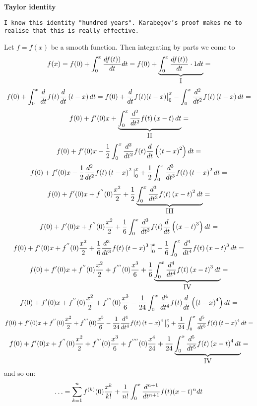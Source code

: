 \medskip

\centerline {\bf Taylor identity}

{\tt I know this identity "hundred  years". 
Karabegov's proof makes me to realise that
this is really effective.}

\medskip

   Let $f=f(x)$ be a smooth function. Then
          integrating by parts we come to
                $$
f(x)=
f(0)+\int_0^x {d f(t))\over dt}dt=
f(0)+\underbrace{\int_0^x {d f(t))\over dt}\cdot 1 dt}
        _{\hbox{I}}=
         $$
          $$
f(0)+\int_0^x {d\over dt} f(t){d\over dt}\left(t-x\right)dt=
f(0)+{d\over dt} f(t)(t-x)\big\vert^x_0-
   \int_0^x {d^2\over dt^2} f(t)\left(t-x\right)dt=
            $$
           $$
f(0)+f'(0)x+
   \underbrace
            {
 \int_0^x {d^2\over dt^2} f(t)\left(x-t\right)dt
           }_{\hbox{II}}=
            $$
            $$
f(0)+f'(0)x-    {1\over2}\int_0^x {d^2\over dt^2} f(t)
    {d\over dt}\left(\left(t-x\right)^2\right)dt
           =
           $$
        $$
f(0)+f'(0)x
-   {1\over 2} {d^2\over dt^2} f(t)
    \left(t-x\right)^2\big\vert^x_0
   +
   {1\over 2}\int_0^x {d^3\over dt^3} f(t)
    \left(t-x\right)^2 dt=
          $$
            $$
f(0)+f'(0)x
+f^{''}(0) {x^2\over 2}  
   +
             {1\over 2}
      \underbrace
         {
\int_0^x {d^3\over dt^3} f(t)
    \left(x-t\right)^2 dt
        }_{\hbox{III}}=
          $$
          $$
f(0)+f'(0)x
+f^{''}(0){x^2\over 2}
+    {1\over 6 }\int_0^x {d^3\over dt^3} f(t)
    {d\over dt}\left(\left(x-t\right)^3\right)dt
           =
          $$
            $$
f(0)+f'(0)x
+f^{''}(0){x^2\over 2}
+   {1\over 6} {d^3\over dt^3} f(t)
    \left(t-x\right)^3\big\vert^x_0
   -
   {1\over 6}\int_0^x {d^4\over dt^4} f(t)
    \left(x-t\right)^3 dt=
          $$
            $$
f(0)+f'(0)x
+f^{''}(0) {x^2\over 2}  
+f^{'''}(0) {x^3\over 6}  
   +
             {1\over 6}
      \underbrace
         {
\int_0^x {d^4\over dt^4} f(t)
    \left(x-t\right)^3 dt
        }_{\hbox{IV}}=
          $$
           $$
f(0)+f'(0)x
+f^{''}(0){x^2\over 2}
+f^{'''}(0){x^3\over 6}
-    {1\over 24 }\int_0^x {d^4\over dt^4} f(t)
    {d\over dt}\left(\left(t-x\right)^4\right)dt
           =
          $$
            $$
f(0)+f'(0)x
+f^{''}(0){x^2\over 2}
+f^{'''}(0){x^3\over 6}
-   {1\over 24} {d^4\over dt^4} f(t)
    \left(t-x\right)^4\big\vert^x_0
   +
   {1\over 24}\int_0^x {d^5\over dt^5} f(t)
    \left(t-x\right)^4 dt=
          $$
            $$
f(0)+f'(0)x
+f^{''}(0) {x^2\over 2}  
+f^{'''}(0) {x^3\over 6}  
+f^{''''}(0) {x^4\over 24}  
   +
             {1\over 24}
      \underbrace
         {
\int_0^x {d^5\over dt^5} f(t)
    \left(x-t\right)^4 dt
        }_{\hbox{IV}}=
          $$
and so on:
          $$
\ldots=\sum_{k=1}^n f^{(k)}(0){x^k\over k!}+
         {1\over n!}\int_0^x 
{d^{n+1}\over dt^{n+1}}f(t)(x-t)^ndt
          $$

